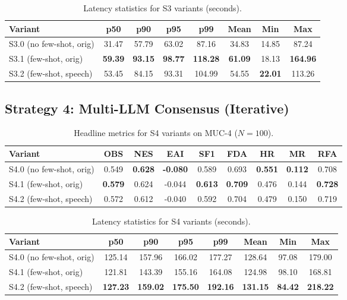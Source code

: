 \begin{table}[H]
 \centering
\caption{Latency statistics for S3 variants (seconds).}
\label{tab:s3-latency-all}
\begin{tabular}{lccccccc}
\toprule
 Variant & p50 & p90 & p95 & p99 & Mean & Min & Max \\
\midrule
 S3.0 (no few-shot, orig) & 31.47 & 57.79 & 63.02 & 87.16 & 34.83 & 14.85 & 87.24 \\
 S3.1 (few-shot, orig) & \textbf{59.39} & \textbf{93.15} & \textbf{98.77} & \textbf{118.28} & \textbf{61.09} & 18.13 & \textbf{164.96} \\
 S3.2 (few-shot, speech) & 53.45 & 84.15 & 93.31 & 104.99 & 54.55 & \textbf{22.01} & 113.26 \\
\bottomrule
\end{tabular}
\end{table}

\subsection{Strategy 4: Multi-LLM Consensus (Iterative)}
\label{appendix:s4-results}

\begin{table}[H]
 \centering
\caption{Headline metrics for S4 variants on MUC-4 ($N{=}100$).}
\label{tab:s4-variants-headline}
\begin{tabular}{lcccccccc}
\toprule
 Variant & OBS & NES & EAI & SF1 & FDA & HR & MR & RFA \\
\midrule
 S4.0 (no few-shot, orig) & 0.549 & \textbf{0.628} & \textbf{-0.080} & 0.589 & 0.693 & \textbf{0.551} & \textbf{0.112} & 0.708 \\
 S4.1 (few-shot, orig) & \textbf{0.579} & 0.624 & -0.044 & \textbf{0.613} & \textbf{0.709} & 0.476 & 0.144 & \textbf{0.728} \\
 S4.2 (few-shot, speech) & 0.572 & 0.612 & -0.040 & 0.592 & 0.704 & 0.479 & 0.150 & 0.719 \\
\bottomrule
\end{tabular}
\end{table}

\begin{table}[H]
 \centering
\caption{Latency statistics for S4 variants (seconds).}
\label{tab:s4-latency-all}
\begin{tabular}{lccccccc}
\toprule
 Variant & p50 & p90 & p95 & p99 & Mean & Min & Max \\
\midrule
 S4.0 (no few-shot, orig) & 125.14 & 157.96 & 166.02 & 177.27 & 128.64 & 97.08 & 179.00 \\
 S4.1 (few-shot, orig) & 121.81 & 143.39 & 155.16 & 164.08 & 124.98 & 98.10 & 168.81 \\
 S4.2 (few-shot, speech) & \textbf{127.23} & \textbf{159.02} & \textbf{175.50} & \textbf{192.16} & \textbf{131.15} & \textbf{84.42} & \textbf{218.22} \\
\bottomrule
\end{tabular}
\end{table}

